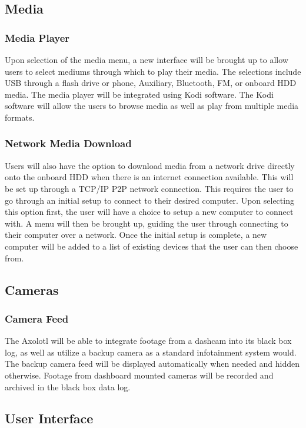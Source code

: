 \documentclass[onecolumn, draftclsnofoot,10pt, compsoc]{IEEEtran}
\begin{document}
\subsection{Media}
\subsubsection{Media Player}
Upon selection of the media menu, a new interface will be brought up to allow users to select mediums through which to play their media. The selections include USB through a flash drive or phone, Auxiliary, Bluetooth, FM, or onboard HDD media. The media player will be integrated using Kodi software. The Kodi software will allow the users to browse media as well as play from multiple media formats. 

\subsubsection{Network Media Download}
Users will also have the option to download media from a network drive directly onto the onboard HDD when there is an internet connection available. This will be set up through a TCP/IP P2P network connection. This requires the user to go through an initial setup to connect to their desired computer. Upon selecting this option first, the user will have a choice to setup a new computer to connect with. A menu will then be brought up, guiding the user through connecting to their computer over a network. Once the initial setup is complete, a new computer will be added to a list of existing devices that the user can then choose from. 

\subsection{Cameras}
\subsubsection{Camera Feed}
The Axolotl will be able to integrate footage from a dashcam into its black box log, as well as utilize a backup camera as a standard infotainment system would. The backup camera feed will be displayed automatically when needed and hidden otherwise. Footage from dashboard mounted cameras will be recorded and archived in the black box data log. 

\subsection{User Interface}
\end{document}
